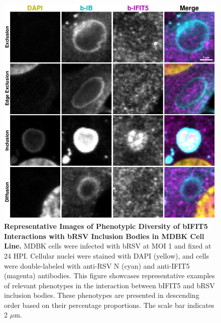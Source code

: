 \begin{figure}
    \centering
    \includegraphics[width=1\linewidth]{08. Chapter 3/Figs/02. Infection/04. IFIT5/09. mdbk i5.pdf}
    \caption[Representative Images of Phenotypic Diversity of bIFIT5 Interactions with bRSV Inclusion Bodies in MDBK Cell Line.]{\textbf{Representative Images of Phenotypic Diversity of bIFIT5 Interactions with bRSV Inclusion Bodies in MDBK Cell Line.} MDBK cells were infected with bRSV at MOI 1 and fixed at 24 HPI. Cellular nuclei were stained with DAPI (yellow), and cells were double-labeled with anti-RSV N (cyan) and anti-IFIT5 (magenta) antibodies. This figure showcases representative examples of relevant phenotypes in the interaction between bIFIT5 and bRSV inclusion bodies. These phenotypes are presented in descending order based on their percentage proportions. The scale bar indicates 2 \(\mu \mbox{m}\).}
    \label{fig:Representative Images of Phenotypic Diversity of bIFIT5 Interactions with bRSV Inclusion Bodies in MDBK Cell Line}
\end{figure}